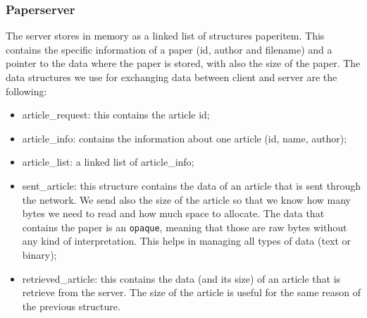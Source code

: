 \subsubsection{Paperserver}
The server stores in memory as a linked list of structures paperitem. This contains the specific information of a paper (id, author and filename) and a pointer to the data where the paper is stored, with also the size of the paper.
The data structures we use for exchanging data between client and server are the following:
\begin{itemize}
\item article\_request: this contains the article id;
\item article\_info: contains the information about one article (id, name, author);
\item article\_list: a linked list of article\_info;
\item sent\_article: this structure contains the data of an article that is sent through the network. We send also the size of the article so that we know how many bytes we need to read and how much space to allocate. The data that contains the paper is an \texttt{opaque}, meaning that those are raw bytes without any kind of interpretation. This helps in managing all types of data (text or binary);
\item retrieved\_article: this contains the data (and its size) of an article that is retrieve from the server. The size of the article is useful for the same reason of the previous structure.
\end{itemize}


